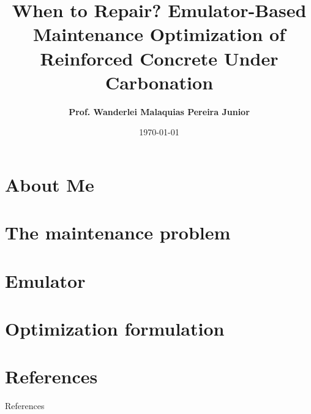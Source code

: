 \documentclass{beamer}
\title{\textbf{When to Repair? Emulator-Based Maintenance Optimization of Reinforced Concrete Under Carbonation}}
\author[W. M. Pereira Jr.]{\textbf{Prof. Wanderlei Malaquias Pereira Junior}}
\institute{Federal University of Catalão \\ University of Minnesota}
\date{\today}
\begin{document}


\section{About Me}
    
\section{The maintenance problem}
    
    
    
\section{Emulator}
    
    
    
\section{Optimization formulation}
    
    
    
    
    
    
    

%     
%     
%     
%     
%     
%     
%     
%     
%     

\section{References}

\begin{frame}[allowframebreaks]{References}
\tiny


\end{frame}


\end{document}
